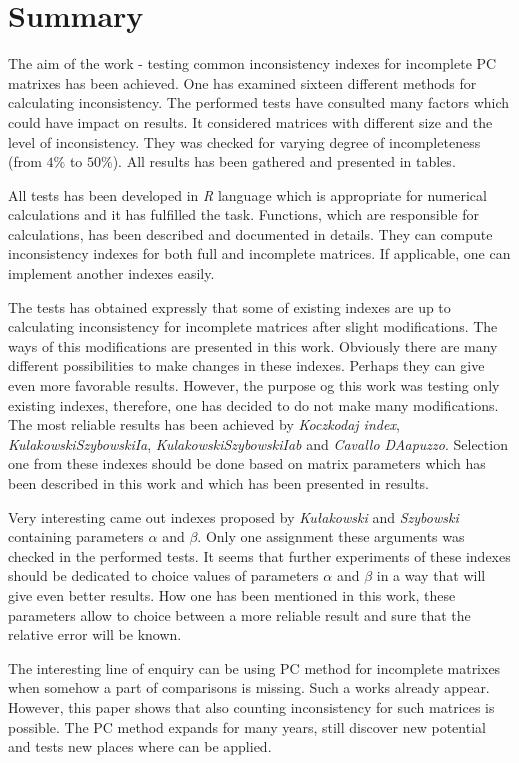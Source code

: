 \chapter{Summary}
\label{sec:summary}

The aim of the work - testing common inconsistency indexes for incomplete PC matrixes has been achieved. One has examined sixteen different methods for calculating inconsistency. The performed tests have consulted many factors which could have impact on results. It considered matrices with different size and the level of inconsistency. They was checked for varying degree of incompleteness (from $4\%$ to $50\%$). All results has been gathered and presented in tables.

All tests has been developed in \textit{R} language which is appropriate for numerical calculations and it has fulfilled the task. Functions, which are responsible for calculations, has been described and documented in details. They can compute inconsistency indexes for both full and incomplete matrices. If applicable, one can implement another indexes easily.

The tests has obtained expressly that some of existing indexes are up to calculating inconsistency for incomplete matrices after slight modifications. The ways of this modifications are presented in this work. Obviously there are many different possibilities to make changes in these indexes. Perhaps they can give even more favorable results. However, the purpose og this work was testing only existing indexes, therefore, one has decided to do not make many modifications. The most reliable results has been achieved by \textit{Koczkodaj index}, \textit{KulakowskiSzybowskiIa}, \textit{KulakowskiSzybowskiIab} and \textit{Cavallo DAapuzzo}. Selection one from these indexes should be done based on matrix parameters which has been described in this work and which has been presented in results.

Very interesting came out indexes proposed by \textit{Kułakowski} and \textit{Szybowski} containing parameters $\alpha$ and $\beta$. Only one assignment these arguments was checked in the performed tests. It seems that further experiments of these indexes should be dedicated to choice values of parameters $\alpha$ and $\beta$ in a way that will give even better results. How one has been mentioned in this work, these parameters allow to choice between a more reliable result and sure that the relative error will be known.

The interesting line of enquiry can be using PC method for incomplete matrixes when somehow a part of comparisons is missing. Such a works already appear. However, this paper shows that also counting inconsistency for such matrices is possible. The PC method expands for many years, still discover new potential and tests new places where can be applied.